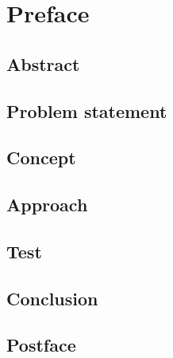 \documentclass[a4paper,10pt,titlepage,twocolumn]{report}
\begin{document}

\newpage


\newpage
{}

\newcommand{\todo}[1]{\textbf{\textsc{\textcolor{red}{[#1]}}}}

\chapter*{Preface}

\label{preface}

\newpage

\section*{Abstract}

\label{abstract}

\section*{Problem statement}
\label{problem}


\section*{Concept}
\label{concept}


\section*{Approach}
\label{approach}


\section*{Test}
\label{test}


\section*{Conclusion}
\label{conclusion}


\section*{Postface}
\label{postface}


\printbibliography
\end{document}
